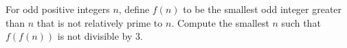 For odd positive integers $n$, define $f(n)$ to be the smallest odd integer greater than $n$ that is not relatively prime to $n$. Compute the smallest $n$ such that $f(f(n))$ is not divisible by $3$.